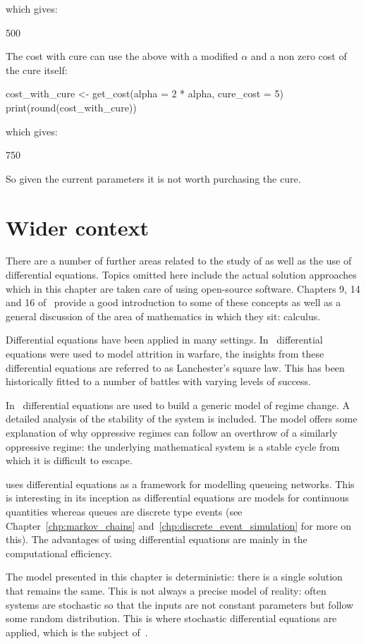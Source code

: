 which gives:

\begin{Rout}
[1] 500
\end{Rout}

The cost with cure can use the above with a modified \(\alpha\) and a non zero
cost of the cure itself:

\begin{Rin}
cost_with_cure <- get_cost(alpha = 2 * alpha, cure_cost = 5)
print(round(cost_with_cure))
\end{Rin}

which gives:

\begin{Rout}
[1] 750
\end{Rout}

So given the current parameters it is not worth purchasing the cure.

\section{Wider context}\label{sec:differential_equations_wider_context}

There are a number of further areas related to the study of as well as the use
of differential equations. Topics omitted here include the actual solution
approaches which in this chapter are taken
care of using open-source software. Chapters 9, 14 and 16
of~\cite{stewart2009calculus} provide a good introduction to some of
these concepts as well as a general discussion of the area of mathematics in
which they sit: calculus.

Differential equations have been applied in many settings.
In~\cite{lanchester1916aircraft} differential equations were used to model
attrition in warfare, the insights from these differential equations are
referred to as Lanchester's square law. This has been historically fitted to a
number of battles with varying levels of success.

In~\cite{syms2015dynamic} differential equations are used to build a
generic model of regime change. A detailed analysis of the stability of the
system is included. The model offers some explanation of why oppressive regimes
can follow an overthrow of a similarly oppressive regime: the underlying
mathematical system is a stable cycle from which it is difficult to escape.

\cite{vandergraft1983fluid} uses differential equations as a framework for
modelling queueing networks. This is interesting in its inception as
differential equations are models for continuous quantities whereas queues are
discrete type events (see Chapter~\ref{chp:markov_chains}
and~\ref{chp:discrete_event_simulation} for more on this). The advantages of
using differential equations are mainly in the computational efficiency.

The model presented in this chapter is deterministic: there is a single solution
that remains the same. This is not always a precise model of reality: often
systems are stochastic so that the inputs are not constant parameters but follow
some random distribution. This is where stochastic differential equations are
applied, which is the subject of~\cite{sarkka2019applied}.
